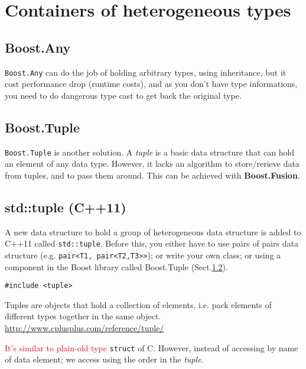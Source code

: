 \section{Containers of heterogeneous types}	


\subsection{Boost.Any}
\label{sec:Boost.Any}

\verb!Boost.Any! can do the job of holding arbitrary types, using inheritance,
but it cost performance drop (runtime costs), and as you don't have type informations,
you need to do dangerous type cast to get back the original type.

\subsection{Boost.Tuple}
\label{sec:Boost.Tuple}

\verb!Boost.Tuple! is another solution. A {\it tuple} is a basic data structure
that can hold an element of any data type. However, it lacks an algorithm to
store/rerieve data from tuples, and to pass them around. This can be achieved
with {\bf Boost.Fusion}.

\subsection{std::tuple (C++11)}
\label{sec:std::tuple}

A new data structure to hold a group of heterogeneous data structure is added to
C++11 called \verb!std::tuple!. Before this, you either have to use pairs of
pairs data structure (e.g. \verb!pair<T1, pair<T2,T3>>!); or write your own
class; or using a component in the Boost library called Boost.Tuple
(Sect.\ref{sec:Boost.Tuple}).

\begin{verbatim}
#include <tuple>
\end{verbatim}

Tuples are objects that hold a collection of elements, i.e. pack elements of
different types together in the same object.
\url{http://www.cplusplus.com/reference/tuple/}

\textcolor{red}{It's similar to plain-old type} \verb!struct! of C. However,
instead of accessing by name of data element; we access using the order in the
{\it tuple}.

